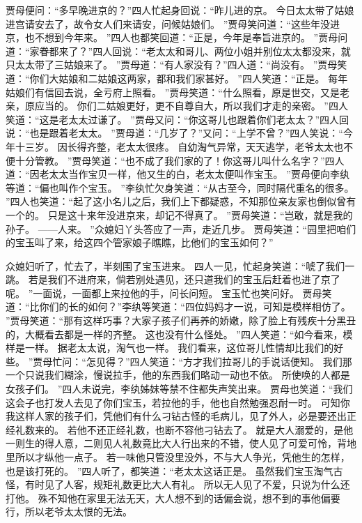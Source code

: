 贾母便问：“多早晚进京的？”四人忙起身回说：“昨儿进的京。
今日太太带了姑娘进宫请安去了，故令女人们来请安，问候姑娘们。
”贾母笑问道：“这些年没进京，也不想到今年来。
”四人也都笑回道：“正是，今年是奉旨进京的。
”贾母问道：“家眷都来了？”四人回说：“老太太和哥儿、两位小姐并别位太太都没来，就只太太带了三姑娘来了。
”贾母道：“有人家没有？”四人道：“尚没有。
”贾母笑道：“你们大姑娘和二姑娘这两家，都和我们家甚好。
”四人笑道：“正是。
每年姑娘们有信回去说，全亏府上照看。
”贾母笑道：“什么照看，原是世交，又是老亲，原应当的。
你们二姑娘更好，更不自尊自大，所以我们才走的亲密。
”四人笑道：“这是老太太过谦了。
”贾母又问：“你这哥儿也跟着你们老太太？”四人回说：“也是跟着老太太。
”贾母道：“几岁了？”又问：“上学不曾？”四人笑说：“今年十三岁。
因长得齐整，老太太很疼。
自幼淘气异常，天天逃学，老爷太太也不便十分管教。
”贾母笑道：“也不成了我们家的了！你这哥儿叫什么名字？”四人道：“因老太太当作宝贝一样，他又生的白，老太太便叫作宝玉。
”贾母便向李纨等道：“偏也叫作个宝玉。
”李纨忙欠身笑道：“从古至今，同时隔代重名的很多。
”四人也笑道：“起了这小名儿之后，我们上下都疑惑，不知那位亲友家也倒似曾有一个的。
只是这十来年没进京来，却记不得真了。
”贾母笑道：“岂敢，就是我的孙子。
——人来。
”众媳妇丫头答应了一声，走近几步。
贾母笑道：“园里把咱们的宝玉叫了来，给这四个管家娘子瞧瞧，比他们的宝玉如何？”\par
众媳妇听了，忙去了，半刻围了宝玉进来。
四人一见，忙起身笑道：“唬了我们一跳。
若是我们不进府来，倘若别处遇见，还只道我们的宝玉后赶着也进了京了呢。
”一面说，一面都上来拉他的手，问长问短。
宝玉忙也笑问好。
贾母笑道：“比你们的长的如何？”李纨等笑道：“四位妈妈才一说，可知是模样相仿了。
”贾母笑道：“那有这样巧事？大家子孩子们再养的娇嫩，除了脸上有残疾十分黑丑的，大概看去都是一样的齐整。
这也没有什么怪处。
”四人笑道：“如今看来，模样是一样。
据老太太说，淘气也一样。
我们看来，这位哥儿性情却比我们的好些。
”贾母忙问：“怎见得？”四人笑道：“方才我们拉哥儿的手说话便知。
我们那一个只说我们糊涂，慢说拉手，他的东西我们略动一动也不依。
所使唤的人都是女孩子们。
”四人未说完，李纨姊妹等禁不住都失声笑出来。
贾母也笑道：“我们这会子也打发人去见了你们宝玉，若拉他的手，他也自然勉强忍耐一时。
可知你我这样人家的孩子们，凭他们有什么刁钻古怪的毛病儿，见了外人，必是要还出正经礼数来的。
若他不还正经礼数，也断不容他刁钻去了。
就是大人溺爱的，是他一则生的得人意，二则见人礼数竟比大人行出来的不错，使人见了可爱可怜，背地里所以才纵他一点子。
若一味他只管没里没外，不与大人争光，凭他生的怎样，也是该打死的。
”四人听了，都笑道：“老太太这话正是。
虽然我们宝玉淘气古怪，有时见了人客，规矩礼数更比大人有礼。
所以无人见了不爱，只说为什么还打他。
殊不知他在家里无法无天，大人想不到的话偏会说，想不到的事他偏要行，所以老爷太太恨的无法。
